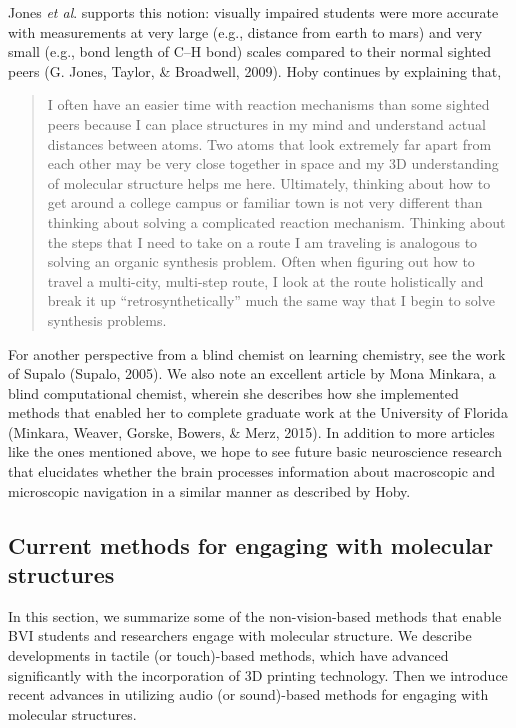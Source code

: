 \documentclass[11.5pt]{sig-alternate} %
\begin{document}
\begin{large}
Jones \textit{et al}. supports this notion: visually impaired students were more accurate with measurements at very large (e.g., distance from earth to mars) and very small (e.g., bond length of C–H bond) scales compared to their normal sighted peers (G. Jones, Taylor, \& Broadwell, 2009). Hoby continues by explaining that,  

\begin{quote}
    I often have an easier time with reaction mechanisms than some sighted peers because I can place structures in my mind and understand actual distances between atoms. Two atoms that look extremely far apart from each other may be very close together in space and my 3D understanding of molecular structure helps me here. Ultimately, thinking about how to get around a college campus or familiar town is not very different than thinking about solving a complicated reaction mechanism. Thinking about the steps that I need to take on a route I am traveling is analogous to solving an organic synthesis problem. Often when figuring out how to travel a multi-city, multi-step route, I look at the route holistically and break it up “retrosynthetically” much the same way that I begin to solve synthesis problems.
\end{quote}

For another perspective from a blind chemist on learning chemistry, see the work of Supalo (Supalo, 2005). We also note an excellent article by Mona Minkara, a blind computational chemist, wherein she describes how she implemented methods that enabled her to complete graduate work at the University of Florida (Minkara, Weaver, Gorske, Bowers, \& Merz, 2015). In addition to more articles like the ones mentioned above, we hope to see future basic neuroscience research that elucidates whether the brain processes information about macroscopic and microscopic navigation in a similar manner as described by Hoby. 

\subsection*{Current methods for engaging with molecular structures}

In this section, we summarize some of the non-vision-based methods that enable BVI students and researchers engage with molecular structure. We describe developments in tactile (or touch)-based methods, which have advanced significantly with the incorporation of 3D printing technology. Then we introduce recent advances in utilizing audio (or sound)-based methods for engaging with molecular structures. 


\end{large}
\end{document}
